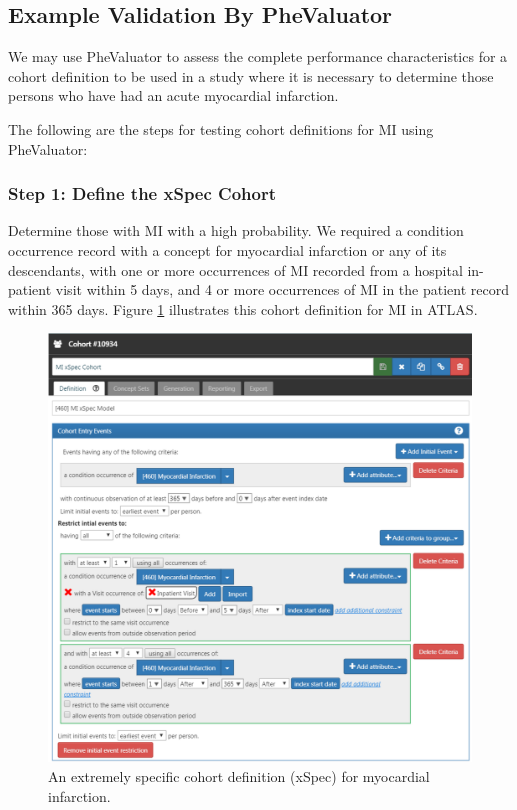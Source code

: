 \documentclass[11pt]{book}
\theoremstyle{definition}
\theoremstyle{definition}
\theoremstyle{definition}
\theoremstyle{remark}
\begin{document}
\subsection{Example Validation By
PheValuator}\label{example-validation-by-phevaluator}

We may use PheValuator to assess the complete performance
characteristics for a cohort definition to be used in a study where it
is necessary to determine those persons who have had an acute myocardial
infarction.

The following are the steps for testing cohort definitions for MI using
PheValuator:

\subsubsection*{Step 1: Define the xSpec
Cohort}\label{step-1-define-the-xspec-cohort}

Determine those with MI with a high probability. We required a condition
occurrence record with a concept for myocardial infarction or any of its
descendants, with one or more occurrences of MI recorded from a hospital
in-patient visit within 5 days, and 4 or more occurrences of MI in the
patient record within 365 days. Figure \ref{fig:xSpec} illustrates this
cohort definition for MI in ATLAS. 

\begin{figure}

{\centering \includegraphics[width=1\linewidth]{images/ClinicalValidity/xSpec} 

}

\caption{An extremely specific cohort definition (xSpec) for myocardial infarction.}\label{fig:xSpec}
\end{figure}
\end{document}
